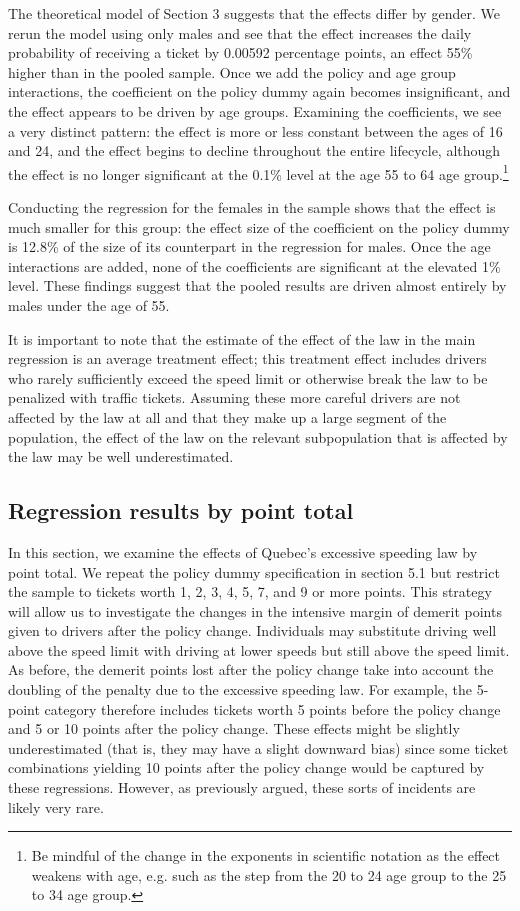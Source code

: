 The theoretical model of Section 3 suggests that the effects differ by gender. We rerun the model using only males and see that the effect increases the daily probability of receiving a ticket by 0.00592 percentage points, an effect 55\% higher than in the pooled sample. Once we add the policy and age group interactions, the coefficient on the policy dummy again becomes insignificant, and the effect appears to be driven by age groups. Examining the coefficients, we see a very distinct pattern: the effect is more or less constant between the ages of 16 and 24, and the effect begins to decline throughout the entire lifecycle, although the effect is no longer significant at the 0.1\% level at the age 55 to 64 age group.\footnote{%
Be mindful of the change in the exponents in scientific notation as the effect weakens with age, e.g. such as the step from the 20 to 24 age group to the 25 to 34 age group.
}

Conducting the regression for the females in the sample shows that the effect is much smaller for this group: the effect size of the coefficient on the policy dummy is 12.8\% of the size of its counterpart in the regression for males. Once the age interactions are added, none of the coefficients are significant at the elevated 1\% level. These findings suggest that the pooled results are driven almost entirely by males under the age of 55.

It is important to note that the estimate of the effect of the law in the main regression is an average treatment effect; this treatment effect includes drivers who rarely sufficiently exceed the speed limit or otherwise break the law to be penalized with traffic tickets. Assuming these more careful drivers are not affected by the law at all and that they make up a large segment of the population, the effect of the law on the relevant subpopulation that is affected by the law may be well underestimated.


\subsection{Regression results by point total}

In this section, we examine the effects of Quebec’s excessive speeding law by point total. We repeat the policy dummy specification in section 5.1 but restrict the sample to tickets worth 1, 2, 3, 4, 5, 7, and 9 or more points. This strategy will allow us to investigate the changes in the intensive margin of demerit points given to drivers after the policy change. Individuals may substitute driving well above the speed limit with driving at lower speeds but still above the speed limit. As before, the demerit points lost after the policy change take into account the doubling of the penalty due to the excessive speeding law. For example, the 5-point category therefore includes tickets worth 5 points before the policy change and 5 or 10 points after the policy change. These effects might be slightly underestimated (that is, they may have a slight downward bias) since some ticket combinations yielding 10 points after the policy change would be captured by these regressions. However, as previously argued, these sorts of incidents are likely very rare. \\

